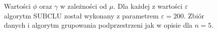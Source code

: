 \begin{figure}
	\centering
	\caption{Wartości $ \phi $ oraz $ \gamma $ w zależności od $ \mu $. Dla każdej z wartości $ \varepsilon $ algorytm SUBCLU został wykonany z parametrem $ \varepsilon=200 $. Zbiór danych i algorytm grupowania podprzestrzeni jak w opisie  dla $ n = 5 $.}
	\label{fig:odc:subclu-phi-gamma-of-mi}
\end{figure}